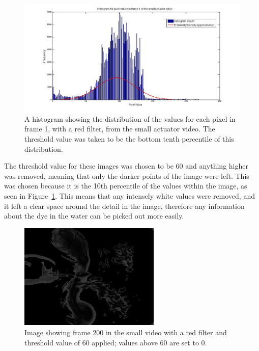 
\begin{figure}[H]
	\centering
	\includegraphics[width=1\textwidth]{Pictures/Pixel_Distribution.jpg}
    \caption{A histogram showing the distribution of the values for each pixel in frame 1, with a red filter, from the small actuator video. The threshold value was taken to be the bottom tenth percentile of this distribution. }
    \label{fig:pixeldistribution}
\end{figure}




The threshold value for these images was chosen to be 60 and anything higher was removed, meaning that only the darker points of the image were left. This was chosen because it is the 10th percentile of the values within the image, as seen in Figure~\ref{fig:pixeldistribution}. This means that any intensely white values were removed, and it left a clear space around the detail in the image, therefore any information about the dye in the water can be picked out more easily.

\begin{figure}[H]
	\centering
	\includegraphics[width=0.6\textwidth]{Pictures/smallthresh.png}
    \caption{Image showing frame 200 in the small video with a red filter and threshold value of 60 applied; values above 60 are set to 0. }
    \label{fig:smallthresh}
\end{figure}




